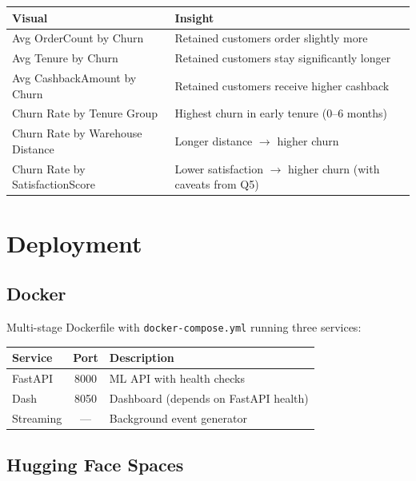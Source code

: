 \documentclass[11pt,a4paper]{article}
\newcommand{\tech}[1]{\texttt{\small\color{primarydark}#1}}
\begin{document}
\begin{table}[H]
\centering
{}
\begin{tabularx}{\textwidth}{l X}
\toprule
\textbf{Visual} & \textbf{Insight} \\
\midrule
Avg OrderCount by Churn & Retained customers order slightly more \\
Avg Tenure by Churn & Retained customers stay significantly longer \\
Avg CashbackAmount by Churn & Retained customers receive higher cashback \\
Churn Rate by Tenure Group & Highest churn in early tenure (0--6 months) \\
Churn Rate by Warehouse Distance & Longer distance $\rightarrow$ higher churn \\
Churn Rate by SatisfactionScore & Lower satisfaction $\rightarrow$ higher churn (with caveats from Q5) \\
\bottomrule
\end{tabularx}
\end{table}

\section{Deployment}

\subsection{Docker}

Multi-stage Dockerfile with \tech{docker-compose.yml} running three services:

\begin{table}[H]
\centering
{}
\begin{tabularx}{\textwidth}{l c X}
\toprule
\textbf{Service} & \textbf{Port} & \textbf{Description} \\
\midrule
FastAPI & 8000 & ML API with health checks \\
Dash & 8050 & Dashboard (depends on FastAPI health) \\
Streaming & --- & Background event generator \\
\bottomrule
\end{tabularx}
\end{table}

\subsection{Hugging Face Spaces}
\end{document}
